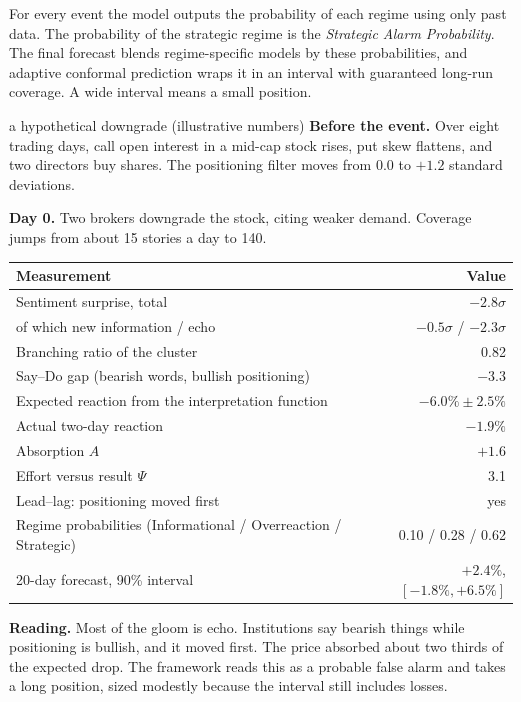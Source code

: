 \documentclass[11pt,a4paper]{article}
\theoremstyle{plain}
\theoremstyle{definition}
\begin{document}
For every event the model outputs the probability of each regime using only past data. The probability of the strategic regime is the \emph{Strategic Alarm Probability}. The final forecast blends regime-specific models by these probabilities, and adaptive conformal prediction \citep{gibbs2021} wraps it in an interval with guaranteed long-run coverage. A wide interval means a small position.

\begin{workedexample}{a hypothetical downgrade (illustrative numbers)}
\small
\textbf{Before the event.} Over eight trading days, call open interest in a mid-cap stock rises, put skew flattens, and two directors buy shares. The positioning filter moves from $0.0$ to $+1.2$ standard deviations.

\textbf{Day 0.} Two brokers downgrade the stock, citing weaker demand. Coverage jumps from about 15 stories a day to 140.

\begin{tabularx}{\linewidth}{@{}Xr@{}}
\toprule
Measurement & Value \\
\midrule
Sentiment surprise, total & $-2.8\sigma$ \\
\quad of which new information / echo & $-0.5\sigma$ / $-2.3\sigma$ \\
Branching ratio of the cluster & 0.82 \\
Say--Do gap (bearish words, bullish positioning) & $-3.3$ \\
Expected reaction from the interpretation function & $-6.0\% \pm 2.5\%$ \\
Actual two-day reaction & $-1.9\%$ \\
Absorption $A$ & $+1.6$ \\
Effort versus result $\Psi$ & 3.1 \\
Lead--lag: positioning moved first & yes \\
Regime probabilities (Informational / Overreaction / Strategic) & 0.10 / 0.28 / 0.62 \\
20-day forecast, 90\% interval & $+2.4\%$, $[-1.8\%, +6.5\%]$ \\
\bottomrule
\end{tabularx}

\textbf{Reading.} Most of the gloom is echo. Institutions say bearish things while positioning is bullish, and it moved first. The price absorbed about two thirds of the expected drop. The framework reads this as a probable false alarm and takes a long position, sized modestly because the interval still includes losses.
\end{workedexample}
\end{document}
